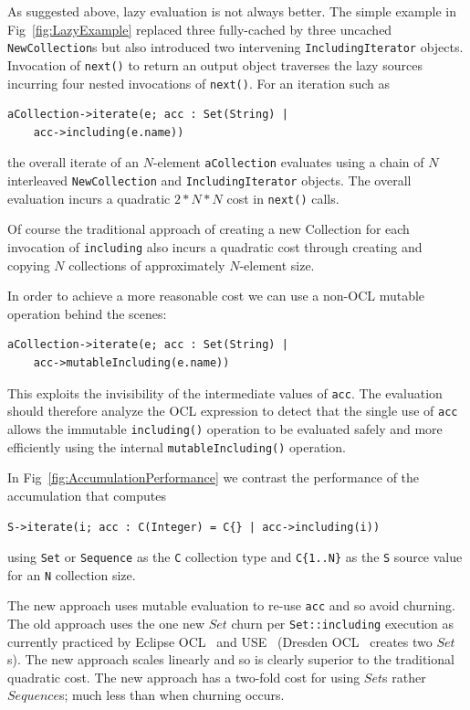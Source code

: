 \documentclass{llncs}
\begin{document}
As suggested above, lazy evaluation is not always better. The simple example in Fig~\ref{fig:LazyExample} replaced three fully-cached by three uncached \verb$NewCollection$s but also introduced two intervening \verb$IncludingIterator$ objects. Invocation of \verb$next()$ to return an output object traverses the lazy sources incurring four nested invocations of \verb$next()$. For an iteration such as

\begin{verbatim}
aCollection->iterate(e; acc : Set(String) |
    acc->including(e.name))
\end{verbatim}

the overall iterate of an $N$-element \verb$aCollection$ evaluates using a chain of $N$ interleaved \verb$NewCollection$ and \verb$IncludingIterator$ objects. The overall evaluation incurs a quadratic $2*N*N$ cost in \verb$next()$ calls.

Of course the traditional approach of creating a new Collection for each invocation of \verb$including$ also incurs a quadratic cost through creating and copying $N$ collections of approximately $N$-element size.

In order to achieve a more reasonable cost we can use a non-OCL mutable operation behind the scenes:

\begin{verbatim}
aCollection->iterate(e; acc : Set(String) |
    acc->mutableIncluding(e.name))
\end{verbatim}

This exploits the invisibility of the intermediate values of \verb$acc$. The evaluation should therefore analyze the OCL expression to detect that the single use of \verb$acc$ allows the immutable \verb$including()$ operation to be evaluated safely and more efficiently using the internal \verb$mutableIncluding()$ operation. 

In Fig~\ref{fig:AccumulationPerformance} we contrast the performance of the accumulation that computes 

\verb$S->iterate(i; acc : C(Integer) = C{} | acc->including(i))$

using \verb$Set$ or \verb$Sequence$ as the \verb$C$ collection type and \verb$C{1..N}$ as the \verb$S$ source value for an \verb$N$ collection size.

The new approach uses mutable evaluation to re-use \verb$acc$ and so avoid churning.
The old approach uses the one new $Set$ churn per \verb$Set::including$ execution as currently practiced by Eclipse OCL~\cite{Eclipse-OCL} and USE~\cite{USE} (Dresden OCL~\cite{Dresden-OCL} creates two $Set$s). The new approach scales linearly and so is clearly superior to the traditional quadratic cost. The new approach has a two-fold cost for using $Set$s rather $Sequence$s; much less than when churning occurs.
\end{document}

